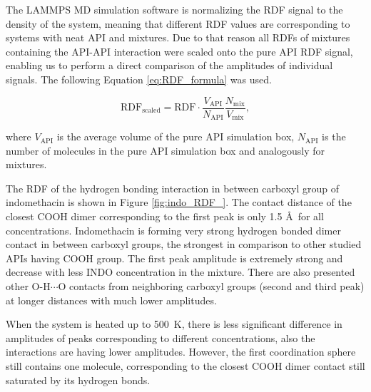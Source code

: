 The LAMMPS MD simulation software is normalizing the RDF signal to the density of the system, meaning that different RDF values are corresponding to systems with neat API and mixtures. Due to that reason all RDFs of mixtures containing the API-API interaction were scaled onto the pure API RDF signal, enabling us to perform a direct comparison of the amplitudes of individual signals. The following Equation \ref{eq:RDF_formula} was used.

\begin{equation}\label{eq:RDF_formula}
	\text{RDF}_{\text{scaled}} = \text{RDF} \cdot \frac{V_{\text{API}}}{N_{\text{API}}} \frac{N_{\text{mix}}}{V_{\text{mix}}},
\end{equation}

\vspace{-0.2cm}

where $V_{\text{API}}$ is the average volume of the pure API simulation box, $N_{\text{API}}$ is the number of molecules in the pure API simulation box and analogously for mixtures.

The RDF of the hydrogen bonding interaction in between carboxyl group of indomethacin is shown in Figure \ref{fig:indo_RDF_}. The contact distance of the closest COOH dimer corresponding to the first peak is only 1.5 \AA~for all concentrations. Indomethacin is forming very strong hydrogen bonded dimer contact in between carboxyl groups, the strongest in comparison to other studied APIs having COOH group. The first peak amplitude is extremely strong and decrease with less INDO concentration in the mixture. There are also presented other O-H$\cdots$O contacts from neighboring carboxyl groups (second and third peak) at longer distances with much lower amplitudes.

When the system is heated up to 500~K, there is less significant difference in amplitudes of peaks corresponding to different concentrations, also the interactions are having lower amplitudes. However, the first coordination sphere still contains one molecule, corresponding to the closest COOH dimer contact still saturated by its hydrogen bonds.

